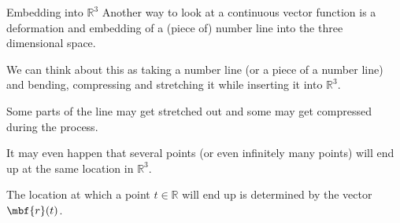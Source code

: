 \documentclass[aspectratio=169]{beamer}
\newcommand{\vect}[1]{\mbf{#1}}
\begin{document}
\begin{frame}{Embedding into $\mathbb{R}^3$}
    Another way to look at a continuous vector function is a deformation and
    embedding of a (piece of) number line into the three dimensional
    space.\pause

    We can think about this as taking a number line (or a piece of a number
    line) and bending, compressing and stretching it while inserting it into
    $\mathbb{R}^3$.\pause

    Some parts of the line may get stretched out and some may get compressed
    during the process.\pause

    It may even happen that several points (or even infinitely many points)
    will end up at the same location in $\mathbb{R}^3$.\pause

    The location at which a point $t \in \mathbb{R}$ will end up is determined
    by the vector $\vect{r}(t)$.
\end{frame}
\end{document}
